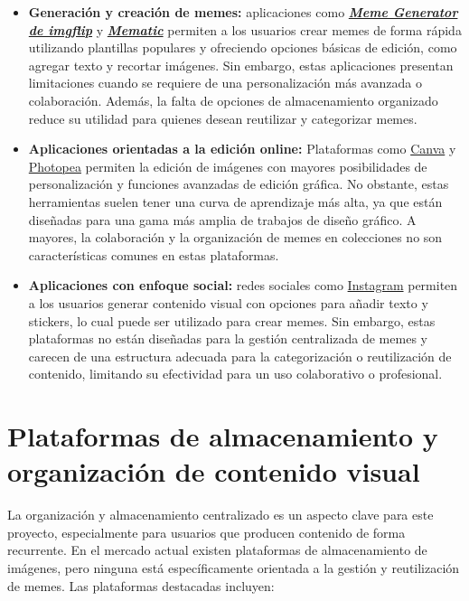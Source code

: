 \begin{itemize}
  \item \textbf{Generación y creación de memes:} aplicaciones como \textit{\textbf{\href{https://imgflip.com/memegenerator}{Meme Generator de imgflip}}} y \textit{\textbf{\href{https://www.mematic.com/}{Mematic}}} permiten a los usuarios crear memes de forma rápida utilizando plantillas populares y ofreciendo opciones básicas de edición, como agregar texto y recortar imágenes. Sin embargo, estas aplicaciones presentan limitaciones cuando se requiere de una personalización más avanzada o colaboración. Además, la falta de opciones de almacenamiento organizado reduce su utilidad para quienes desean reutilizar y categorizar memes.
  \item \textbf{Aplicaciones orientadas a la edición online:} Plataformas como \href{https://www.canva.com/es_es/}{Canva} y \href{https://www.photopea.com/}{Photopea} permiten la edición de imágenes con mayores posibilidades de personalización y funciones avanzadas de edición gráfica. No obstante, estas herramientas suelen tener una curva de aprendizaje más alta, ya que están diseñadas para una gama más amplia de trabajos de diseño gráfico. A mayores, la colaboración y la organización de memes en colecciones no son características comunes en estas plataformas.
  \item \textbf{Aplicaciones con enfoque social:} redes sociales como \href{https://www.instagram.com/}{Instagram} permiten a los usuarios generar contenido visual con opciones para añadir texto y stickers, lo cual puede ser utilizado para crear memes. Sin embargo, estas plataformas no están diseñadas para la gestión centralizada de memes y carecen de una estructura adecuada para la categorización o reutilización de contenido, limitando su efectividad para un uso colaborativo o profesional.
\end{itemize}

\section{Plataformas de almacenamiento y organización de contenido visual}

La organización y almacenamiento centralizado es un aspecto clave para este proyecto, especialmente para usuarios que producen contenido de forma recurrente. En el mercado actual existen plataformas de almacenamiento de imágenes, pero ninguna está específicamente orientada a la gestión y reutilización de memes. Las plataformas destacadas incluyen:

